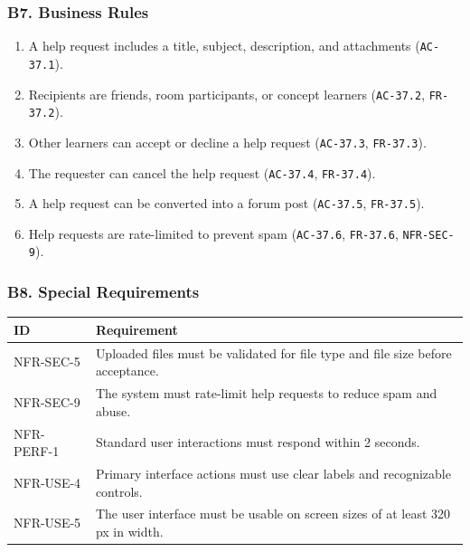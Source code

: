 \documentclass[12pt]{article}
\renewcommand{\baselinestretch}{1.5}
\begin{document}
\hypertarget{sec:b7-business-rules}{}
\subsubsection*{B7. Business Rules}
\par\medskip

\begin{enumerate}
\item A help request includes a title, subject, description, and attachments (\texttt{AC-37.1}).
\item Recipients are friends, room participants, or concept learners (\texttt{AC-37.2}, \texttt{FR-37.2}).
\item Other learners can accept or decline a help request (\texttt{AC-37.3}, \texttt{FR-37.3}).
\item The requester can cancel the help request (\texttt{AC-37.4}, \texttt{FR-37.4}).
\item A help request can be converted into a forum post (\texttt{AC-37.5}, \texttt{FR-37.5}).
\item Help requests are rate-limited to prevent spam (\texttt{AC-37.6}, \texttt{FR-37.6}, \texttt{NFR-SEC-9}).
\end{enumerate}
\par\medskip

\hypertarget{sec:b8-special-requirements}{}
\subsubsection*{B8. Special Requirements}
\par\medskip

\begingroup
\small
\renewcommand{\baselinestretch}{1.0}\selectfont
\renewcommand{\arraystretch}{1.15}
\setlength{\tabcolsep}{6pt}
\begin{longtable}{|>{\raggedright\arraybackslash}p{}|>{\raggedright\arraybackslash}p{}|}
\hline
\textbf{ID} & \textbf{Requirement} \\ \hline
\endhead
NFR-SEC-5 & Uploaded files must be validated for file type and file size before acceptance. \\ \hline
NFR-SEC-9 & The system must rate-limit help requests to reduce spam and abuse. \\ \hline
NFR-PERF-1 & Standard user interactions must respond within 2 seconds. \\ \hline
NFR-USE-4 & Primary interface actions must use clear labels and recognizable controls. \\ \hline
NFR-USE-5 & The user interface must be usable on screen sizes of at least 320 px in width. \\ \hline
\end{longtable}
\endgroup
\par\medskip
\end{document}
